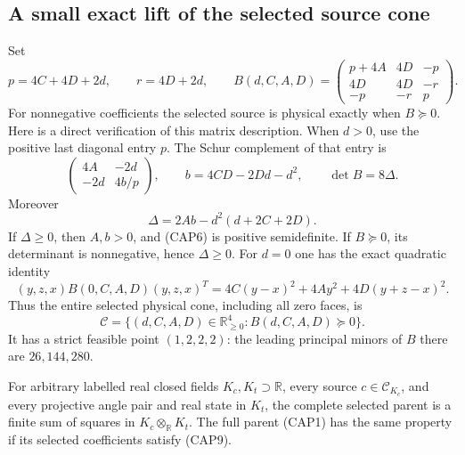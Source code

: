\subsection{A small exact lift of the selected source cone}

Set
\[
p=4C+4D+2d,\qquad r=4D+2d,\qquad
B(d,C,A,D)=
\begin{pmatrix}
p+4A&4D&-p\\
4D&4D&-r\\
-p&-r&p
\end{pmatrix}.
\tag{CAP5}
\]
For nonnegative coefficients the selected source is physical exactly
when $B\succeq0$.  Here is a direct verification of this matrix
description.  When $d>0$, use the positive last diagonal entry $p$.
The Schur complement of that entry is
\[
\begin{pmatrix}4A&-2d\\-2d&4b/p\end{pmatrix},
\qquad b=4CD-2Dd-d^2,
\qquad \det B=8\Delta.
\tag{CAP6}
\]
Moreover
\[
\Delta=2Ab-d^2(d+2C+2D).
\tag{CAP7}
\]
If $\Delta\geq0$, then $A,b>0$, and (CAP6) is positive semidefinite.
If $B\succeq0$, its determinant is nonnegative, hence $\Delta\geq0$.
For $d=0$ one has the exact quadratic identity
\[
(y,z,x)B(0,C,A,D)(y,z,x)^T
 =4C(y-x)^2+4Ay^2+4D(y+z-x)^2.
\tag{CAP8}
\]
Thus the entire selected physical cone, including all zero faces, is
\[
\mathcal C=\{(d,C,A,D)\in\mathbb R_{\geq0}^4:B(d,C,A,D)\succeq0\}.
\tag{CAP9}
\]
It has a strict feasible point $(1,2,2,2)$: the leading principal
minors of $B$ there are $26,144,280$.

\begin{lemma}
For arbitrary labelled real closed fields $K_c,K_t\supset\mathbb R$,
every source $c\in\mathcal C_{K_c}$, and every projective angle pair
and real state in $K_t$, the complete selected parent is a finite sum
of squares in $K_c\otimes_{\mathbb R}K_t$.  The full parent (CAP1)
has the same property if its selected coefficients satisfy (CAP9).
\end{lemma}

